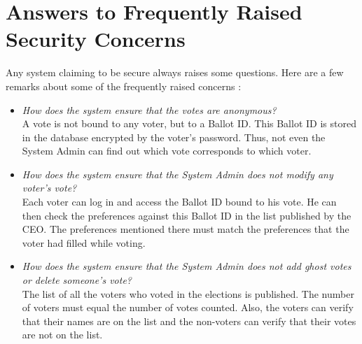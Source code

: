 \documentclass[twoside,twocolumn]{article}
\newcommand\tab[1][1cm]{\hspace*{#1}}
\begin{document}
\section{Answers to Frequently Raised Security Concerns}
    \tab Any system claiming to be secure always raises some questions. Here are a few remarks about some of the frequently raised concerns :
    \begin{itemize}
        \item \textit{How does the system ensure that the votes are anonymous?}\\
              \tab A vote is not bound to any voter, but to a Ballot ID. This Ballot ID is stored in the database encrypted by the voter's password. Thus, not even the System Admin can find out which vote corresponds to which voter.
        \item \textit{How does the system ensure that the System Admin does not modify any voter's vote?}\\
              \tab Each voter can log in and access the Ballot ID bound to his vote. He can then check the preferences against this Ballot ID in the list published by the CEO. The preferences mentioned there must match the preferences that the voter had filled while voting.
        \item \textit{How does the system ensure that the System Admin does not add ghost votes or delete someone's vote?}\\
              \tab The list of all the voters who voted in the elections is published. The number of voters must equal the number of votes counted. Also, the voters can verify that their names are on the list and the non-voters can verify that their votes are not on the list.
    \end {itemize}
\end{document}
